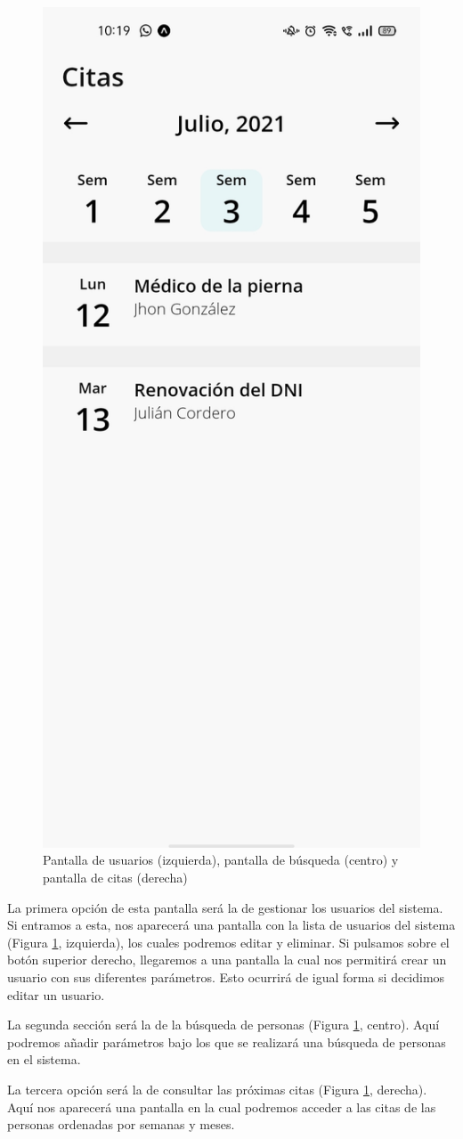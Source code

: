\begin{figure}[h!]
    \hspace{0.03\linewidth}
    \includegraphics[width=0.30\linewidth]{imagenes/manual_usuario/citas.jpg}
    \caption{Pantalla de usuarios (izquierda), pantalla de búsqueda (centro) y pantalla de citas (derecha)}
    \label{fig:man-6}

\end{figure}

La primera opción de esta pantalla será la de gestionar los usuarios del sistema. Si entramos a esta, nos aparecerá una pantalla con la lista de usuarios del sistema (Figura \ref{fig:man-6}, izquierda), los cuales podremos editar y eliminar. Si pulsamos sobre el botón superior derecho, llegaremos a una pantalla la cual nos permitirá crear un usuario con sus diferentes parámetros. Esto ocurrirá de igual forma si decidimos editar un usuario.

La segunda sección será la de la búsqueda de personas (Figura \ref{fig:man-6}, centro). Aquí podremos añadir parámetros bajo los que se realizará una búsqueda de personas en el sistema.

La tercera opción será la de consultar las próximas citas (Figura \ref{fig:man-6}, derecha). Aquí nos aparecerá una pantalla en la cual podremos acceder a las citas de las personas ordenadas por semanas y meses.

